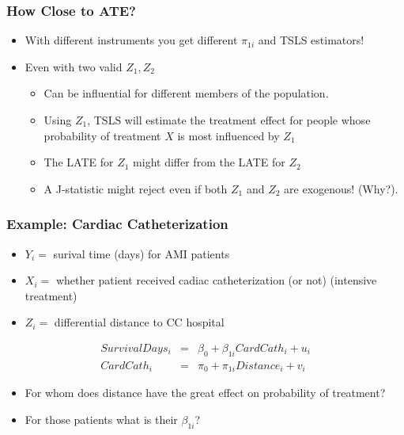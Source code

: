 \begin{frame}
\frametitle{How Close to ATE?}
\begin{itemize}
\item With different instruments you get different $\pi_{1i}$ and TSLS estimators!
\item Even with two valid $Z_1, Z_2$
\begin{itemize}
\item Can be influential for different members of the population.
\item Using $Z_1$, TSLS will estimate the treatment effect for people whose probability of treatment $X$ is most influenced by $Z_1$
\item The LATE for $Z_1$ might differ from the LATE for $Z_2$
\item A J-statistic might reject even if both $Z_1$ and $Z_2$ are exogenous! (Why?).
\end{itemize}
\end{itemize}
\end{frame}


\begin{frame}
\frametitle{Example: Cardiac Catheterization}
\begin{itemize}
\item $Y_i=$ surival time (days) for AMI patients
\item $X_i=$ whether patient received cadiac catheterization (or not) (intensive treatment)
\item $Z_i=$ differential distance to CC hospital
\end{itemize}
\begin{eqnarray*}
SurvivalDays_i &=& \beta_0 + \beta_{1i} CardCath_i + u_i\\
CardCath_i &=& \pi_0 + \pi_{1i} Distance_i + v_i
\end{eqnarray*}
\begin{itemize}
\item For whom does distance have the great effect on probability of treatment?
\item For those patients what is their $\beta_{1i}$?
\end{itemize}
\end{frame}


